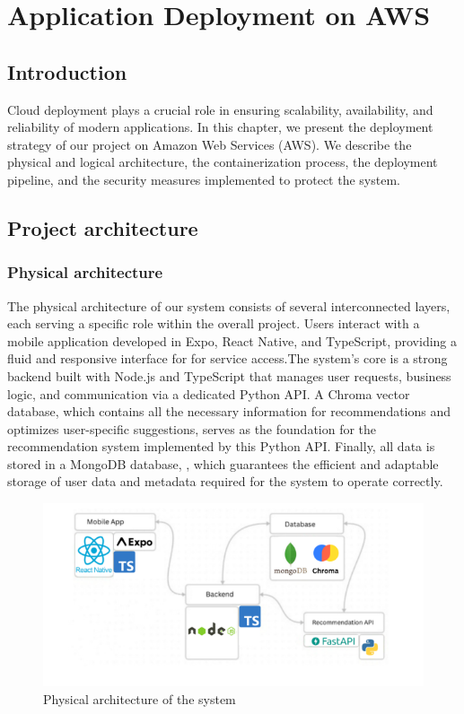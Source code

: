 \chapter{Application Deployment on AWS}
\section*{Introduction}

Cloud deployment plays a crucial role in ensuring scalability,
availability, and reliability of modern applications. In this chapter,
we present the deployment strategy of our project on Amazon Web
Services (AWS). We describe the physical and logical architecture,
the containerization process, the deployment pipeline, and the
security measures implemented to protect the system.

\section{Project architecture}
\subsection{Physical architecture}
The physical architecture of our system consists of several interconnected layers, each serving a specific role within the overall project. Users interact with a mobile application developed in Expo, React Native, and TypeScript, providing a fluid and responsive interface for for service access.The system's core is a strong backend built with Node.js and TypeScript that manages user requests, business logic, and communication via a dedicated Python API.  A Chroma vector database, which contains all the necessary information for recommendations and optimizes user-specific suggestions, serves as the foundation for the recommendation system implemented by this Python API. Finally, all data is stored in a MongoDB database, , which guarantees the efficient and adaptable storage of user data and metadata required for the system to operate correctly.
\begin{center}
\begin{figure}[ht]
            \centering
            \includegraphics[scale=0.72]{images/physic_arch.png}
            \caption{Physical architecture of the system} 
            \label{fig:Physical architecture}
        \end{figure}
\end{center}
    
